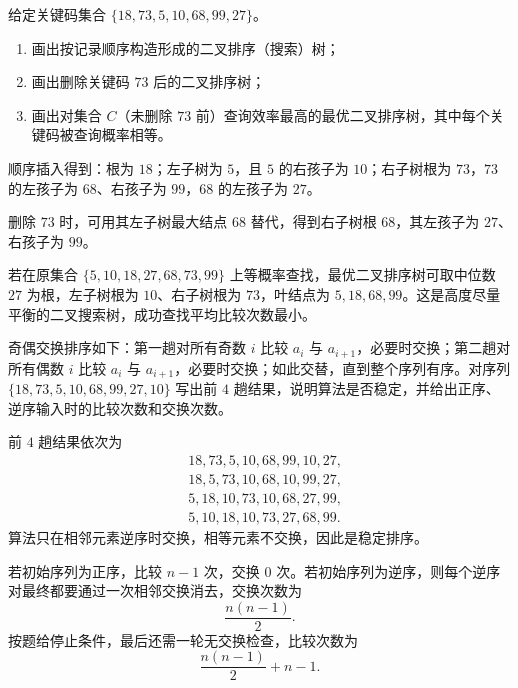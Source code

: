 \begin{question}[二叉搜索树]
给定关键码集合 $\{18,73,5,10,68,99,27\}$。
\begin{enumerate}
  \item 画出按记录顺序构造形成的二叉排序（搜索）树；
  \item 画出删除关键码 $73$ 后的二叉排序树；
  \item 画出对集合 $C$（未删除 $73$ 前）查询效率最高的最优二叉排序树，其中每个关键码被查询概率相等。
\end{enumerate}
\begin{solution}
顺序插入得到：根为 $18$；左子树为 $5$，且 $5$ 的右孩子为 $10$；右子树根为 $73$，$73$ 的左孩子为 $68$、右孩子为 $99$，$68$ 的左孩子为 $27$。

删除 $73$ 时，可用其左子树最大结点 $68$ 替代，得到右子树根 $68$，其左孩子为 $27$、右孩子为 $99$。

若在原集合 $\{5,10,18,27,68,73,99\}$ 上等概率查找，最优二叉排序树可取中位数 $27$ 为根，左子树根为 $10$、右子树根为 $73$，叶结点为 $5,18,68,99$。这是高度尽量平衡的二叉搜索树，成功查找平均比较次数最小。
\end{solution}
\end{question}

\begin{question}[奇偶交换排序]
奇偶交换排序如下：第一趟对所有奇数 $i$ 比较 $a_i$ 与 $a_{i+1}$，必要时交换；第二趟对所有偶数 $i$ 比较 $a_i$ 与 $a_{i+1}$，必要时交换；如此交替，直到整个序列有序。对序列 $\{18,73,5,10,68,99,27,10\}$ 写出前 $4$ 趟结果，说明算法是否稳定，并给出正序、逆序输入时的比较次数和交换次数。
\begin{solution}
前 $4$ 趟结果依次为
\[
\begin{aligned}
&18,73,5,10,68,99,10,27,\\
&18,5,73,10,68,10,99,27,\\
&5,18,10,73,10,68,27,99,\\
&5,10,18,10,73,27,68,99.
\end{aligned}
\]
算法只在相邻元素逆序时交换，相等元素不交换，因此是稳定排序。

若初始序列为正序，比较 $n-1$ 次，交换 $0$ 次。若初始序列为逆序，则每个逆序对最终都要通过一次相邻交换消去，交换次数为
\[
\frac{n(n-1)}{2}.
\]
按题给停止条件，最后还需一轮无交换检查，比较次数为
\[
\frac{n(n-1)}{2}+n-1.
\]
\end{solution}
\end{question}

